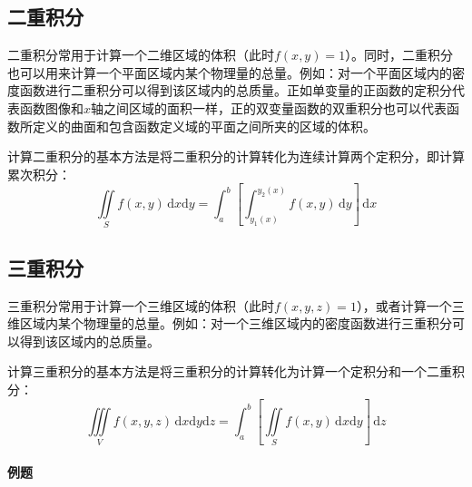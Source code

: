 \documentclass[fontset=none,openany,a4paper]{ctexbook}
\begin{document}
\subsection{二重积分}

二重积分常用于计算一个二维区域的体积（此时$f(x,y) = 1$）。同时，二重积分也可以用来计算一个平面区域内某个物理量的总量。例如：对一个平面区域内的密度函数进行二重积分可以得到该区域内的总质量。正如单变量的正函数的定积分代表函数图像和$x$轴之间区域的面积一样，正的双变量函数的双重积分也可以代表函数所定义的曲面和包含函数定义域的平面之间所夹的区域的体积。

计算二重积分的基本方法是将二重积分的计算转化为连续计算两个定积分，即计算累次积分：
\[
\iint\limits_S f(x,y)\,\mathrm{d}x\mathrm{d}y = \int_a^b\left[\int_{y_1(x)}^{y_2(x)} f(x,y)\,\mathrm{d}y\right]\,\mathrm{d}x
\]

\subsection{三重积分}

三重积分常用于计算一个三维区域的体积（此时$f(x,y,z) = 1$），或者计算一个三维区域内某个物理量的总量。例如：对一个三维区域内的密度函数进行三重积分可以得到该区域内的总质量。

计算三重积分的基本方法是将三重积分的计算转化为计算一个定积分和一个二重积分：
\[
\iiint\limits_V f(x,y,z)\,\mathrm{d}x\mathrm{d}y\mathrm{d}z = \int_a^b\left[\iint\limits_S f(x,y)\,\mathrm{d}x\mathrm{d}y\right]\,\mathrm{d}z
\]

\paragraph{例题}
\end{document}
